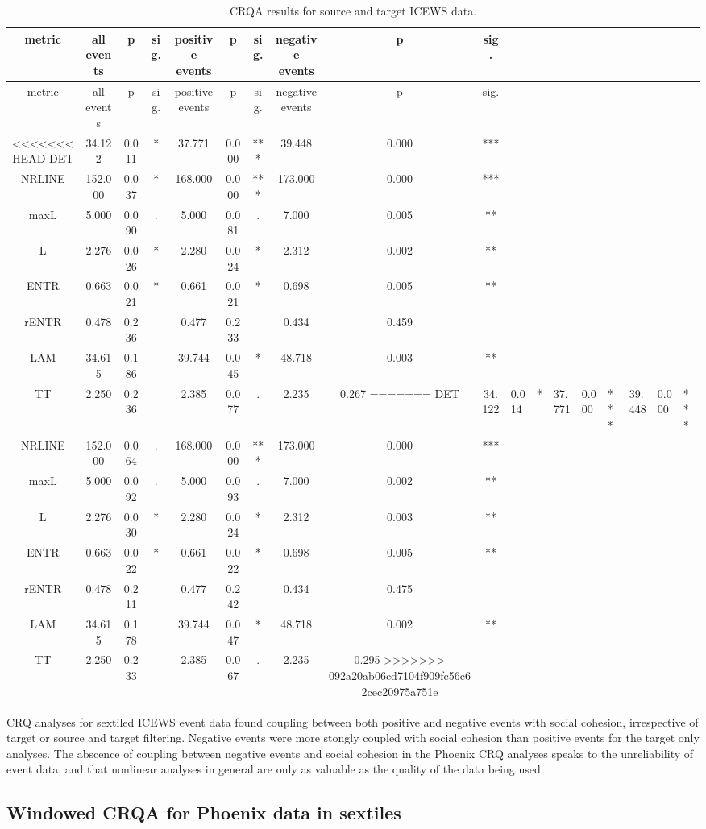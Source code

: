 \begin{appendix}
\begin{longtable}[]{@{}cccccccccc@{}}
\caption{CRQA results for source and target ICEWS data.}\tabularnewline
\toprule
metric & all events & p & sig. & positive events & p & sig. & negative
events & p & sig.\tabularnewline
\midrule
\endfirsthead
\toprule
metric & all events & p & sig. & positive events & p & sig. & negative
events & p & sig.\tabularnewline
\midrule
\endhead
<<<<<<< HEAD
DET & 34.122 & 0.011 & * & 37.771 & 0.000 & *** & 39.448 & 0.000 &
***\tabularnewline
NRLINE & 152.000 & 0.037 & * & 168.000 & 0.000 & *** & 173.000 & 0.000 &
***\tabularnewline
maxL & 5.000 & 0.090 & . & 5.000 & 0.081 & . & 7.000 & 0.005 &
**\tabularnewline
L & 2.276 & 0.026 & * & 2.280 & 0.024 & * & 2.312 & 0.002 &
**\tabularnewline
ENTR & 0.663 & 0.021 & * & 0.661 & 0.021 & * & 0.698 & 0.005 &
**\tabularnewline
rENTR & 0.478 & 0.236 & & 0.477 & 0.233 & & 0.434 & 0.459
&\tabularnewline
LAM & 34.615 & 0.186 & & 39.744 & 0.045 & * & 48.718 & 0.003 &
**\tabularnewline
TT & 2.250 & 0.236 & & 2.385 & 0.077 & . & 2.235 & 0.267
=======
DET & 34.122 & 0.014 & * & 37.771 & 0.000 & *** & 39.448 & 0.000 &
***\tabularnewline
NRLINE & 152.000 & 0.064 & . & 168.000 & 0.000 & *** & 173.000 & 0.000 &
***\tabularnewline
maxL & 5.000 & 0.092 & . & 5.000 & 0.093 & . & 7.000 & 0.002 &
**\tabularnewline
L & 2.276 & 0.030 & * & 2.280 & 0.024 & * & 2.312 & 0.003 &
**\tabularnewline
ENTR & 0.663 & 0.022 & * & 0.661 & 0.022 & * & 0.698 & 0.005 &
**\tabularnewline
rENTR & 0.478 & 0.211 & & 0.477 & 0.242 & & 0.434 & 0.475
&\tabularnewline
LAM & 34.615 & 0.178 & & 39.744 & 0.047 & * & 48.718 & 0.002 &
**\tabularnewline
TT & 2.250 & 0.233 & & 2.385 & 0.067 & . & 2.235 & 0.295
>>>>>>> 092a20ab06cd7104f909fc56c62cec20975a751e
&\tabularnewline
\bottomrule
\end{longtable}

CRQ analyses for sextiled ICEWS event data found coupling between both
positive and negative events with social cohesion, irrespective of
target or source and target filtering. Negative events were more stongly
coupled with social cohesion than positive events for the target only
analyses. The abscence of coupling between negative events and social
cohesion in the Phoenix CRQ analyses speaks to the unreliability of
event data, and that nonlinear analyses in general are only as valuable
as the quality of the data being used.

\hypertarget{windowed-crqa-for-phoenix-data-in-sextiles}{%
\subsection{Windowed CRQA for Phoenix data in
sextiles}\label{windowed-crqa-for-phoenix-data-in-sextiles}}


\end{appendix}
